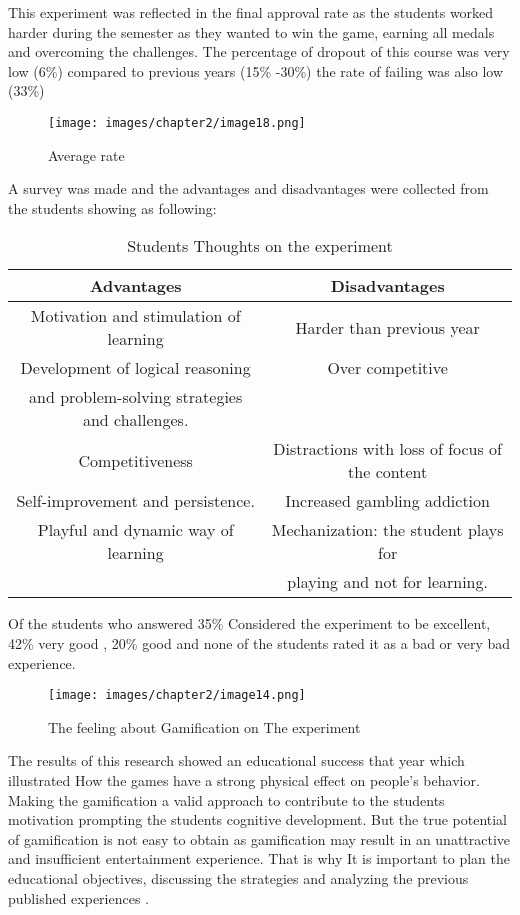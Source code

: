 \documentclass[../main.tex]{subfiles}
\begin{document}
This experiment was reflected in the final approval rate as the students worked harder during the semester as they wanted to win the game, earning all medals and overcoming the challenges. The percentage of dropout of this course was very low (6\%) compared to previous years (15\% -30\%) the rate of failing was also low (33\%) 

\begin{figure}[!ht]
\centering
\texttt{[image: images/chapter2/image18.png]}
\caption{ Average rate}
\label{fig: Average rate}
\end{figure}
\newpage
A survey was made and the advantages and disadvantages were collected from the students showing as following:

\begin{table}[h!]
    \caption{Students Thoughts on the experiment}  
    \centering
    \begin{tabular}{|c|c|}
       \hline
       Advantages & Disadvantages \\
       \hline
       Motivation and stimulation of learning & Harder than previous year \\
       \hline
       Development of logical reasoning  & Over competitive \\ and problem-solving strategies and challenges. & \\
       \hline
       Competitiveness & Distractions with loss of focus of the content \\
       \hline
       Self-improvement and persistence. & Increased gambling addiction \\ 
       \hline
       Playful and dynamic way of learning & Mechanization: the student plays for \\ & playing and not for learning. \\
       \hline
       \end{tabular}
    \label{tab:5}
\end{table}

Of the students who answered 35\%  Considered the experiment to be excellent, 42\% very good , 20\% good and none of the students rated it as a bad or very bad experience.

\begin{figure}[!ht]
\centering
\texttt{[image: images/chapter2/image14.png]}
\caption{The feeling about Gamification on The experiment}
\label{The feeling about Gamification on The experiment
}
\end{figure}

The results of this research showed an educational success that year which illustrated How the games have a strong physical effect on people’s behavior. Making the gamification a valid approach to contribute to the students motivation prompting the students cognitive development. But the true potential of gamification is not easy to obtain as gamification may result in an unattractive and insufficient entertainment experience. That is why It is important to plan the educational objectives, discussing the strategies and analyzing the previous published experiences \cite{26}. 
\end{document}
